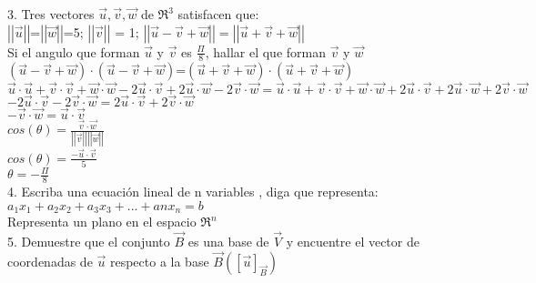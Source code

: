 3. Tres vectores $\vec{u},\vec{v},\vec{w}$ de $\Re^{3}$ satisfacen que:\\

$\left| \left| \vec{u} \right|\right |$=$\left | \left |\vec{w} \right |\right |$=5; $\left| \left| \vec{v} \right|\right |$ = 1; $\left| \left| \vec{u}-\vec{v}+\vec{w} \right|\right|=\left| \left| \vec{u}+\vec{v}+\vec{w} \right|\right|$\\

Si el angulo que forman $\vec{u}$ y $\vec{v}$ es $\frac{\Pi}{8}$, hallar el que forman $\vec{v}$ y $\vec{w}$\\

$\left(\vec{u}-\vec{v}+\vec{w}\right) \cdot \left(\vec{u}-\vec{v}+\vec{w}\right)$=$\left(\vec{u}+ \vec{v}+\vec{w}\right) \cdot \left(\vec{u}+\vec{v}+\vec{w}\right)$\\

$\vec{u} \cdot \vec{u} + \vec{v} \cdot \vec{v} + \vec{w} \cdot \vec{w} - 2 \vec{u} \cdot \vec{v} + 2 \vec{u} \cdot \vec{w} - 2 \vec{v} \cdot \vec{w}=\vec{u} \cdot \vec{u} + \vec{v} \cdot \vec{v} + \vec{w} \cdot \vec{w} + 2 \vec{u} \cdot \vec{v} + 2 \vec{u} \cdot \vec{w} + 2 \vec{v} \cdot \vec{w}$\\

$- 2 \vec{u} \cdot \vec{v} - 2 \vec{v} \cdot \vec{w}= 2 \vec{u} \cdot \vec{v} + 2 \vec{v} \cdot \vec{w}$\\

$ - \vec{v} \cdot \vec{w}= \vec{u} \cdot \vec{v}$\\

$cos(\theta)=\frac{\vec{v} \cdot \vec{w}}{\left| \left| \vec{v} \right|\right |\left| \left| \vec{w} \right|\right |}$\\

$cos(\theta) =\frac {- \vec{u} \cdot \vec{v}}{5}$\\

$\theta = -\frac{\Pi}{8}$\\

4. Escriba una ecuación lineal de n variables , diga que representa:\\

$a_{1}x_{1}+a_{2}x_{2}+a_{3}x_{3}+...+a{n}x_{n}=b$ \\

Representa un plano en el espacio $\Re^{n}$\\

5. Demuestre que el conjunto $\vec{B}$ es una base de $\vec{V}$ y encuentre el vector de coordenadas de $\vec{u}$ respecto a la base $\vec{B} (\left [ \vec{u} \right ]_{\vec{B}})$\\

